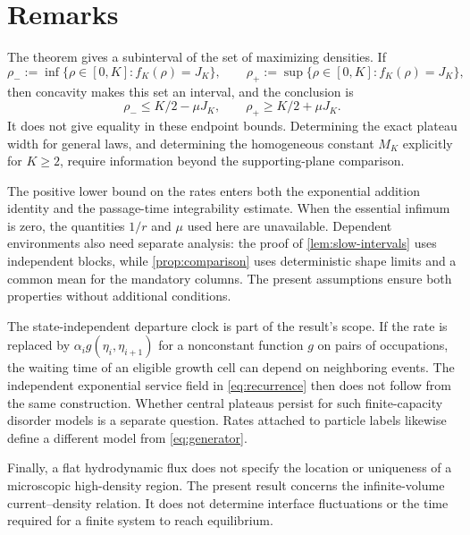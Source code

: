 \documentclass[11pt]{amsart}
\theoremstyle{remark}
\numberwithin{equation}{section}
\begin{document}
\section{Remarks}

The theorem gives a subinterval of the set of maximizing densities.
If
\[
 \rho_-:=\inf\{\rho\in[0,K]:f_K(\rho)=J_K\},\qquad
 \rho_+:=\sup\{\rho\in[0,K]:f_K(\rho)=J_K\},
\]
then concavity makes this set an interval, and the conclusion is
\[
 \rho_-\leq K/2-\mu J_K,
 \qquad \rho_+\geq K/2+\mu J_K.
\]
It does not give equality in these endpoint bounds. Determining the
exact plateau width for general laws, and determining the homogeneous
constant $M_K$ explicitly for $K\geq2$, require information beyond
the supporting-plane comparison.

The positive lower bound on the rates enters both the exponential
addition identity and the passage-time integrability estimate. When
the essential infimum is zero, the quantities $1/r$ and $\mu$ used
here are unavailable. Dependent environments also need separate
analysis: the proof of \cref{lem:slow-intervals} uses independent
blocks, while \cref{prop:comparison} uses deterministic shape limits
and a common mean for the mandatory columns. The present assumptions
ensure both properties without additional conditions.

The state-independent departure clock is part of the result's scope.
If the rate is replaced by $\alpha_i g(\eta_i,\eta_{i+1})$ for a
nonconstant function $g$ on pairs of occupations, the waiting time of
an eligible growth cell can depend on neighboring events. The
independent exponential service field in \eqref{eq:recurrence} then
does not follow from the same construction. Whether central plateaus
persist for such finite-capacity disorder models is a separate
question. Rates attached to particle labels likewise define a
different model from \eqref{eq:generator}.

Finally, a flat hydrodynamic flux does not specify the location or
uniqueness of a microscopic high-density region. The present result
concerns the infinite-volume current--density relation. It does not
determine interface fluctuations or the time required for a finite
system to reach equilibrium.
\end{document}
